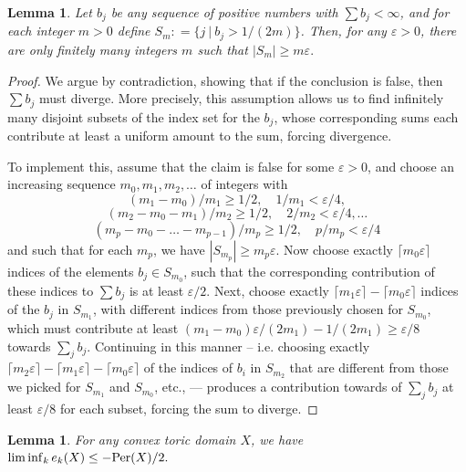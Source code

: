 \documentclass[11pt, reqno]{amsart}
\newtheorem{lemma}[thm]{Lemma}
\theoremstyle{remark}
\numberwithin{equation}{subsection}
\numberwithin{figure}{section}
\theoremstyle{customremark}
\newcommand{\Per}{{\rm Per}}
\newcommand{\eps}{\varepsilon}
\begin{document}
\begin{lemma}\label{lem:warmup2} Let $b_j$ be any  sequence of positive numbers with $\sum b_j <\infty$, and for each integer $m>0$ 
define $S_m : = \{j \ | \ b_j>1/(2m)\}$.
Then, for any $\eps> 0$, there are only finitely many integers $m$  such that $|S_m| 
 \ge m\eps.$
\end{lemma}
\begin{proof}
We argue by contradiction, showing that if the conclusion is false, then $\sum b_j$ must diverge. More precisely, 
this assumption allows us to find infinitely many disjoint subsets of the index set for the $b_j$, whose corresponding sums
each contribute at least a uniform amount to the sum, forcing divergence.

To implement this, assume that the claim is false for some $\eps>0$, and choose an increasing sequence $m_0, m_1,m_2,\dots $ of integers with 
\[ (m_1-m_0)/m_1 \ge 1/2, \quad 1/m_1 < \eps/4,\] 
\[ (m_2-m_0-m_1)/m_2 \ge 1/2, \quad 2/m_2 <  \eps/4, \ldots \] 
\[ (m_p - m_0 - \ldots - m_{p-1})/m_p \ge 1/2, \quad p/m_p < \eps/4 \]
and such that for each $m_p$, we have 
$|S_{m_p}| \ge m_p \eps.$  
Now choose exactly $\lceil m_0 \eps\rceil$ indices of the elements $b_j \in S_{m_0}$, such that the corresponding contribution of these indices to $\sum b_j$ is at least $\eps/2$.   Next, choose exactly 
$\lceil m_1 \eps\rceil - \lceil m_0\eps\rceil$ 
indices of the $b_j$ in $S_{m_1}$, with different indices from those previously chosen for  $S_{m_0}$, which must contribute at least 
$(m_1 - m_0) \eps/ (2m_1) - 1/(2m_1) \ge \eps/8$
 towards $\sum_j b_j$.  Continuing in this manner -- i.e. choosing exactly $\lceil  m_2 \eps\rceil - \lceil  m_1 \eps\rceil - \lceil m_0 \eps\rceil$ of the indices of $b_i$ in $S_{m_2}$ that are different from those we picked for $S_{m_1}$ and $S_{m_0}$, etc., --- produces a contribution towards of $\sum_j b_j$ at least $\eps/8$ for each subset, forcing the sum to diverge.
\end{proof}



\begin{lemma} \label{lem:ECHle} For any convex toric domain $X$,
we have
$\liminf_{k} e_k(X) \le - \Per(X)/2.$
\end{lemma}
\end{document}
